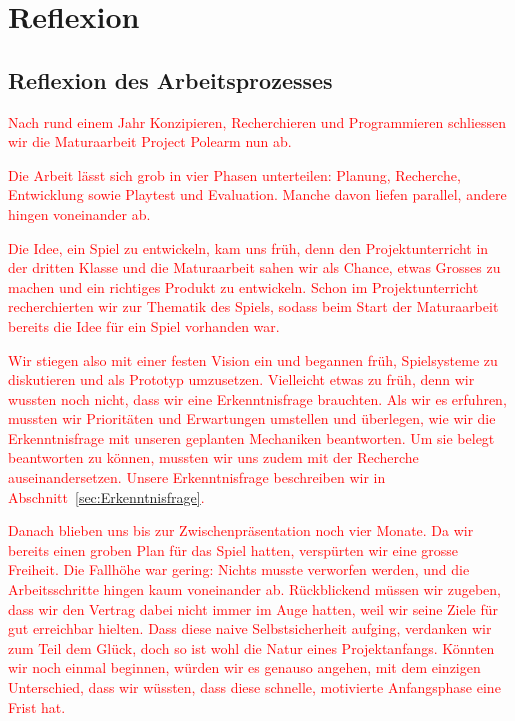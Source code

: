 \documentclass[../Main.tex]{subfiles}
\begin{document}
\section{Reflexion} \label{sec:Reflexion}

\subsection{Reflexion des Arbeitsprozesses}

\textcolor{red}{Nach rund einem Jahr Konzipieren, Recherchieren und Programmieren schliessen wir die Maturaarbeit Project Polearm nun ab.}

\textcolor{red}{Die Arbeit lässt sich grob in vier Phasen unterteilen: Planung, Recherche, Entwicklung sowie Playtest und Evaluation. Manche davon liefen parallel, andere hingen voneinander ab.}

\textcolor{red}{Die Idee, ein Spiel zu entwickeln, kam uns früh, denn den Projektunterricht in der dritten Klasse und die Maturaarbeit sahen wir als Chance, etwas Grosses zu machen und ein richtiges Produkt zu entwickeln. Schon im Projektunterricht recherchierten wir zur Thematik des Spiels, sodass beim Start der Maturaarbeit bereits die Idee für ein Spiel vorhanden war.}

\textcolor{red}{Wir stiegen also mit einer festen Vision ein und begannen früh, Spielsysteme zu diskutieren und als Prototyp umzusetzen. Vielleicht etwas zu früh, denn wir wussten noch nicht, dass wir eine Erkenntnisfrage brauchten. Als wir es erfuhren, mussten wir Prioritäten und Erwartungen umstellen und überlegen, wie wir die Erkenntnisfrage mit unseren geplanten Mechaniken beantworten. Um sie belegt beantworten zu können, mussten wir uns zudem mit der Recherche auseinandersetzen. Unsere Erkenntnisfrage beschreiben wir in Abschnitt~\ref{sec:Erkenntnisfrage}.}

\textcolor{red}{Danach blieben uns bis zur Zwischenpräsentation noch vier Monate. Da wir bereits einen groben Plan für das Spiel hatten, verspürten wir eine grosse Freiheit. Die Fallhöhe war gering: Nichts musste verworfen werden, und die Arbeitsschritte hingen kaum voneinander ab. Rückblickend müssen wir zugeben, dass wir den Vertrag dabei nicht immer im Auge hatten, weil wir seine Ziele für gut erreichbar hielten. Dass diese naive Selbstsicherheit aufging, verdanken wir zum Teil dem Glück, doch so ist wohl die Natur eines Projektanfangs. Könnten wir noch einmal beginnen, würden wir es genauso angehen, mit dem einzigen Unterschied, dass wir wüssten, dass diese schnelle, motivierte Anfangsphase eine Frist hat.}
\end{document}
